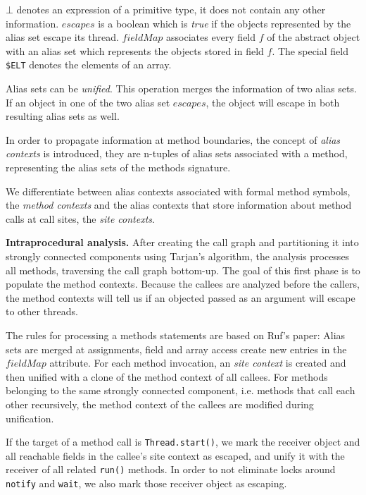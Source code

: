 \documentclass[letterpaper]{article}
\newcommand{\mypar}[1]{{\bf #1.}}
\begin{document}
$\bot$ denotes an expression of a primitive type, it does not contain any other information.
$escapes$ is a boolean which is \emph{true} if the objects represented by the alias set escape its thread.
$fieldMap$ associates every field $f$ of the abstract object with an alias set which represents the objects stored in field $f$.
The special field \texttt{\$ELT} denotes the elements of an array.

Alias sets can be \emph{unified}. This operation merges the information of two alias sets.
If an object in one of the two alias set $escapes$, the object will escape in both resulting alias sets as well.

In order to propagate information at method boundaries, the concept of \emph{alias contexts} is introduced, they
are n-tuples of alias sets associated with a method, representing the alias sets of the methods signature.

We differentiate between alias contexts associated with formal method symbols, the \emph{method contexts} and the
alias contexts that store information about method calls at call sites, the \emph{site contexts}.

\mypar{Intraprocedural analysis} After creating the call graph and partitioning it 
into strongly connected components using Tarjan's algorithm, the analysis processes all methods,
traversing the call graph bottom-up. The goal of this first phase is to populate the
method contexts. Because the callees are analyzed before the callers, the method
contexts will tell us if an objected passed as an argument will escape to other threads.

The rules for processing a methods statements are based on Ruf's \cite{Ruf:00} paper: Alias sets are merged
at assignments, field and array access create new entries in the $fieldMap$ attribute. 
For each method invocation, an \emph{site context} is created and then unified with
a clone of the method context of all callees. For methods belonging to the same strongly connected component, i.e.
methods that call each other recursively, the method context of the callees are modified during unification.

If the target of a method call is \texttt{Thread.start()}, we mark the receiver object and all reachable fields
in the callee's site context as escaped, and unify it with the receiver of all related \texttt{run()} methods.
In order to not eliminate locks around \texttt{notify} and \texttt{wait}, we also mark those receiver
object as escaping. 
\end{document}

